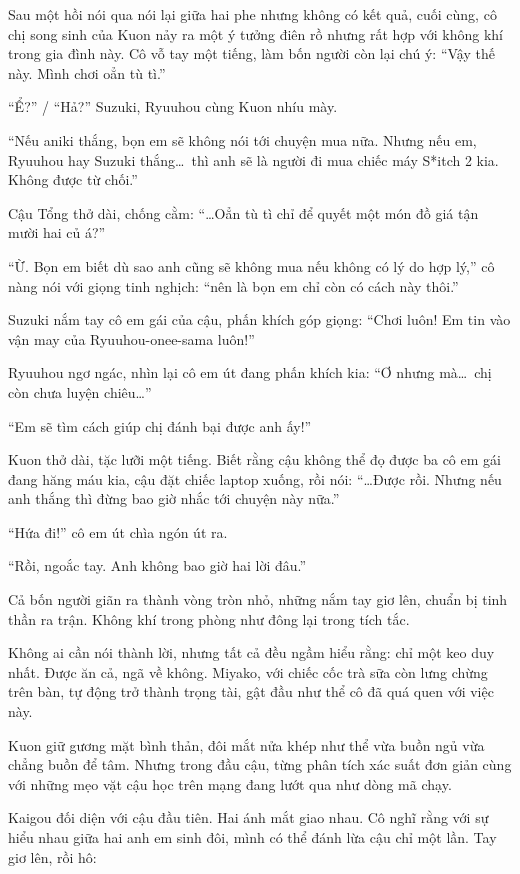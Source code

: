\documentclass[../main.tex]{subfiles}
\begin{document}
Sau một hồi nói qua nói lại giữa hai phe nhưng không có kết quả, cuối cùng, cô chị song sinh của Kuon nảy ra một ý tưởng điên rồ nhưng rất hợp với không khí trong gia đình này. Cô vỗ tay một tiếng, làm bốn người còn lại chú ý: ``Vậy thế này. Mình chơi oẳn tù tì.''

``Ể?'' / ``Hả?'' Suzuki, Ryuuhou cùng Kuon nhíu mày.

``Nếu aniki thắng, bọn em sẽ không nói tới chuyện mua nữa. Nhưng nếu em, Ryuuhou hay Suzuki thắng\dots\ thì anh sẽ là người đi mua chiếc máy S*itch 2 kia. Không được từ chối.''

Cậu Tổng thở dài, chống cằm: ``\dots Oẳn tù tì chỉ để quyết một món đồ giá tận mười hai củ á?''

``Ừ. Bọn em biết dù sao anh cũng sẽ không mua nếu không có lý do hợp lý,'' cô nàng nói với giọng tinh nghịch: ``nên là bọn em chỉ còn có cách này thôi.''

Suzuki nắm tay cô em gái của cậu, phấn khích góp giọng: ``Chơi luôn! Em tin vào vận may của Ryuuhou-onee-sama luôn!''

Ryuuhou ngơ ngác, nhìn lại cô em út đang phấn khích kia: ``Ơ nhưng mà\dots\ chị còn chưa luyện chiêu\dots''

``Em sẽ tìm cách giúp chị đánh bại được anh ấy!''

Kuon thở dài, tặc lưỡi một tiếng. Biết rằng cậu không thể đọ được ba cô em gái đang hăng máu kia, cậu đặt chiếc laptop xuống, rồi nói: ``\dots Được rồi. Nhưng nếu anh thắng thì đừng bao giờ nhắc tới chuyện này nữa.''

``Hứa đi!'' cô em út chìa ngón út ra.

``Rồi, ngoắc tay. Anh không bao giờ hai lời đâu.''

\ct

Cả bốn người giãn ra thành vòng tròn nhỏ, những nắm tay giơ lên, chuẩn bị tinh thần ra trận. Không khí trong phòng như đông lại trong tích tắc.

Không ai cần nói thành lời, nhưng tất cả đều ngầm hiểu rằng: chỉ một keo duy nhất. Được ăn cả, ngã về không. Miyako, với chiếc cốc trà sữa còn lưng chừng trên bàn, tự động trở thành trọng tài, gật đầu như thể cô đã quá quen với việc này.

Kuon giữ gương mặt bình thản, đôi mắt nửa khép như thể vừa buồn ngủ vừa chẳng buồn để tâm. Nhưng trong đầu cậu, từng phân tích xác suất đơn giản cùng với những mẹo vặt cậu học trên mạng đang lướt qua như dòng mã chạy.

Kaigou đối diện với cậu đầu tiên. Hai ánh mắt giao nhau. Cô nghĩ rằng với sự hiểu nhau giữa hai anh em sinh đôi, mình có thể đánh lừa cậu chỉ một lần. Tay giơ lên, rồi hô:
\end{document}
